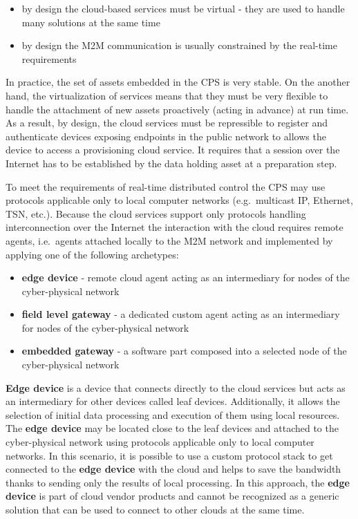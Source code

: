 \documentclass{jacsart}
\begin{document}
\begin{itemize}
      \item by design the cloud-based services must be virtual - they are used to handle many solutions at the same time
      \item by design the M2M communication is usually constrained by the real-time requirements
\end{itemize}

In practice, the set of assets embedded in the CPS is very stable. On the another hand, the virtualization of services means that they must be very flexible to handle the attachment of new assets proactively (acting in advance) at run time. As a result, by design, the cloud services must be repressible to register and authenticate devices exposing endpoints in the public network to allows the device to access a provisioning cloud service. It requires that a session over the Internet has to be established by the data holding asset at a preparation step.

To meet the requirements of real-time distributed control the CPS may use protocols applicable only to local computer networks (e.g.~multicast IP, Ethernet, TSN, etc.). Because the cloud services support only protocols handling interconnection over the Internet the interaction with the cloud requires remote agents, i.e.~agents attached locally to the M2M network and implemented by applying one of the following archetypes:

\begin{itemize}
      \item \textbf{edge device} - remote cloud agent acting as an intermediary for nodes of the cyber-physical network
      \item \textbf{field level gateway} - a dedicated custom agent acting as an intermediary for nodes of the cyber-physical network
      \item \textbf{embedded gateway} - a software part composed into a selected node of the cyber-physical network
\end{itemize}

\textbf{Edge device} is a device that connects directly to the cloud services but acts as an intermediary for other devices called leaf devices. Additionally, it allows the selection of initial data processing and execution of them using local resources. The \textbf{edge device} may be located close to the leaf devices and attached to the cyber-physical network using protocols applicable only to local computer networks. In this scenario, it is possible to use a custom protocol stack to get connected to the \textbf{edge device} with the cloud and helps to save the bandwidth thanks to sending only the results of local processing. In this approach, the \textbf{edge device} is part of cloud vendor products and cannot be recognized as a generic solution that can be used to connect to other clouds at the same time.
\end{document}
